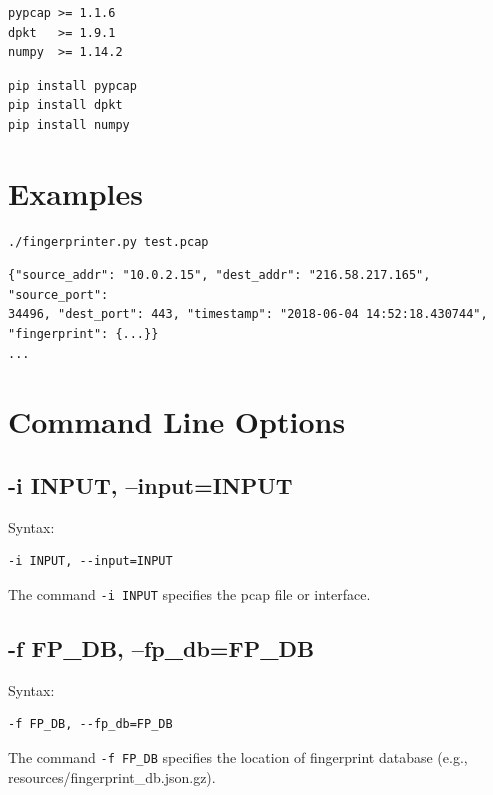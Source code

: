 \documentclass{book}
\begin{document}
\begin{mdframed}[style=cli]
\begin{verbatim}
pypcap >= 1.1.6
dpkt   >= 1.9.1
numpy  >= 1.14.2
\end{verbatim}
\end{mdframed}

\begin{mdframed}[style=cli]
\begin{verbatim}
pip install pypcap
pip install dpkt
pip install numpy
\end{verbatim}
\end{mdframed}

\section{Examples}

\begin{mdframed}[style=cli]
\begin{verbatim}
./fingerprinter.py test.pcap 
\end{verbatim}
\begin{verbatim}
{"source_addr": "10.0.2.15", "dest_addr": "216.58.217.165", "source_port":
34496, "dest_port": 443, "timestamp": "2018-06-04 14:52:18.430744",
"fingerprint": {...}}
...
\end{verbatim}
\end{mdframed}

\section{Command Line Options}

\subsection{-i INPUT, --input=INPUT}
\begin{mdframed}[style=aaa]
Syntax:
  \begin{verbatim}
-i INPUT, --input=INPUT
  \end{verbatim}
\end{mdframed}
The command \texttt{-i INPUT} specifies the pcap file or interface.

\subsection{-f FP\_DB, --fp\_db=FP\_DB}
\begin{mdframed}[style=aaa]
Syntax:
  \begin{verbatim}
-f FP_DB, --fp_db=FP_DB
  \end{verbatim}
\end{mdframed}
The command \texttt{-f FP\_DB} specifies the location of fingerprint database (e.g., resources/fingerprint\_db.json.gz).
\end{document}
